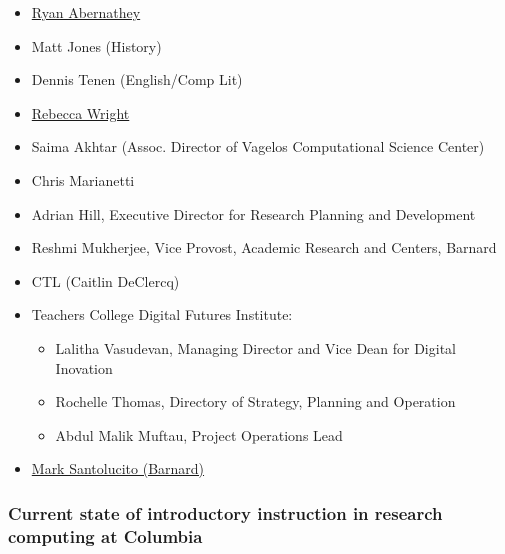 \documentclass[%
  ,
  article,
  ,
  oneside
  ]{memoir}
\begin{document}
\begin{itemize}
\tightlist
\item
  \href{http://github.com/rabernat}{Ryan Abernathey}
\item
  Matt Jones (History)
\item
  Dennis Tenen (English/Comp Lit)
\item
  \href{https://barnard.edu/profiles/rebecca-wright}{Rebecca Wright}
\item
  Saima Akhtar (Assoc. Director of Vagelos Computational Science Center)
\item
  Chris Marianetti
\item
  Adrian Hill, Executive Director for Research Planning and Development
\item
  Reshmi Mukherjee, Vice Provost, Academic Research and Centers, Barnard
\item
  CTL (Caitlin DeClercq)
\item
  Teachers College Digital Futures Institute:

  \begin{itemize}
  \tightlist
  \item
    Lalitha Vasudevan, Managing Director and Vice Dean for Digital
    Inovation
  \item
    Rochelle Thomas, Directory of Strategy, Planning and Operation
  \item
    Abdul Malik Muftau, Project Operations Lead
  \end{itemize}
\item
  \href{https://www.marksantolucito.com/teaching.html}{Mark Santolucito
  (Barnard)}
\end{itemize}

\hypertarget{current-state-of-introductory-instruction-in-research-computing-at-columbia}{%
\subsubsection{Current state of introductory instruction in research
computing at
Columbia}\label{current-state-of-introductory-instruction-in-research-computing-at-columbia}}
\end{document}
